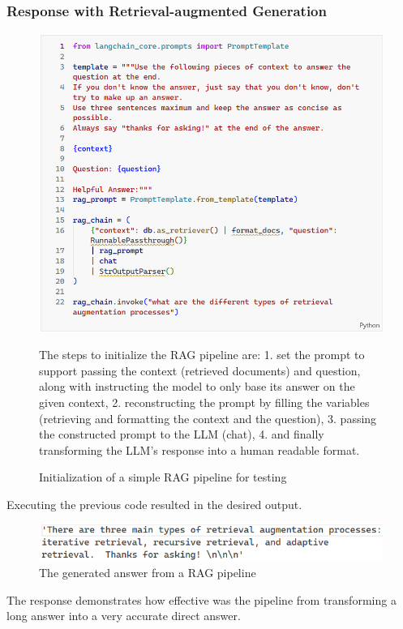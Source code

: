 \subsubsection{Response with Retrieval-augmented Generation}
\begin{figure}[htbp]
    \centering
    \includegraphics[width=.9\linewidth]{./figures/rag-code.png}
    \caption{Initialization of a simple RAG pipeline for testing}
    \begin{flushleft}
        \small The steps to initialize the RAG pipeline are: 1. set the prompt to support passing the context (retrieved documents) and question, along with instructing the model to only base its answer on the given context, 2. reconstructing the prompt by filling the variables (retrieving and formatting the context and the question), 3. passing the constructed prompt to the LLM (chat), 4. and finally transforming the LLM's response into a human readable format.
    \end{flushleft}
\end{figure}\newpage
Executing the previous code resulted in the desired output.
\begin{figure}[htbp]
    \centering
    \includegraphics[width=\linewidth]{./figures/rag-answer.png}
    \caption{The generated answer from a RAG pipeline}
\end{figure}\newline
The response demonstrates how effective was the pipeline from transforming a long answer into a very accurate direct answer.
